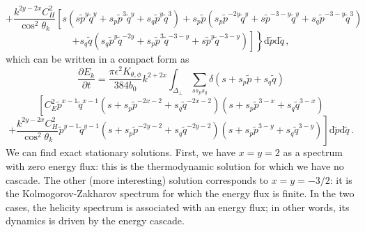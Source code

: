 \documentclass{jpp}
\def\be{\begin{equation}}
\def\ee{\end{equation}}
\def\dd{\mathrm{d}}
\begin{document}
$$
+ \frac{k^{2y-2x} C_H^2}{\cos^2 \theta_k}  \left[ s \left( s{\tilde p}^y {\tilde q}^y + s_p {\tilde p}^3 {\tilde q}^y + s_q {\tilde p}^y {\tilde q}^3 \right)  
+ s_p {\tilde p} \left( s_p {\tilde p}^{-2y} {\tilde q}^y + s {\tilde p}^{-3-y} {\tilde q}^y + s_q {\tilde p}^{-3-y} {\tilde q}^3 \right) \right.
$$
$$
+ \left. \left. s_q {\tilde q} \left( s_q {\tilde p}^y {\tilde q}^{-2y} + s_p {\tilde p}^3 {\tilde q}^{-3-y} + s {\tilde p}^y {\tilde q}^{-3-y} \right) 
 \right] \right\} \dd {\tilde p} \dd {\tilde q} \, ,  
$$
which can be written in a compact form as
\be \label{kinE4}
\frac{\partial E_k}{\partial t} = 
\frac{\pi \epsilon^{2} K_{\theta,\phi}}{384 b_0} k^{2+2x} \int_{\Delta_\perp} \sum_{ss_{p} s_{q}}  
\delta(s+s_p \tilde p+s_q \tilde q)%
\ee
$$
\left[ C_E^2 {\tilde p}^{x-1} {\tilde q}^{x-1} \left(s+s_p {\tilde p}^{-2x-2} +s_q {\tilde q}^{-2x-2} \right) 
\left(s+s_p {\tilde p}^{3-x} +s_q {\tilde q}^{3-x} \right) \right. 
$$
$$
\left. + \frac{k^{2y-2x}C_H^2}{ \cos^2 \theta_k} {\tilde p}^{y-1} {\tilde q}^{y-1}
\left( s+ s_p{\tilde p}^{-2y-2} + s_q{\tilde q}^{-2y-2} \right) 
\left(s+ s_p{\tilde p}^{3-y} + s_q{\tilde q}^{3-y} \right) \right] 
\dd {\tilde p} \dd {\tilde q} \, .
$$
We can find exact stationary solutions. First, we have $x=y=2$ as a spectrum with zero energy flux: this is the thermodynamic solution for which we have no cascade. The other (more interesting) solution corresponds to $x=y=-3/2$: it is the Kolmogorov-Zakharov spectrum for which the energy flux is finite. 
In the two cases, the helicity spectrum is associated with an energy flux; in other words, its dynamics is driven by the energy cascade. 
\end{document}
